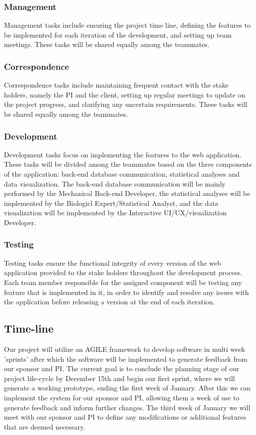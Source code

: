 \documentclass[10pt,twocolumn,letterpaper]{article}
\begin{document}
                \subsubsection{Management}
                Management tasks include ensuring the project time line, defining the features to be implemented for each iteration of the development, and setting up team meetings. 
                These tasks will be shared equally among the teammates.
                \subsubsection{Correspondence}
                Correspondence tasks include maintaining frequent contact with the stake holders, namely the PI and the client, setting up regular meetings to update on the project progress, and clarifying any uncertain requirements. 
                These tasks will be shared equally among the teammates.
                \subsubsection{Development}
                Development tasks focus on implementing the features to the web application. These tasks will be divided among the teammates based on the three components of the application: back-end database communication, statistical analyses and data visualization. 
                The back-end database communication will be mainly performed by the Mechanical Back-end Developer, the statistical analyses will be implemented by the Biologicl Expert/Statistical Analyst, and the data visualization will be implemented by the Interactive UI/UX/visualization Developer.
                \subsubsection{Testing}
                Testing tasks ensure the functional integrity of every version of the web application provided to the stake holders throughout the development process. Each team member responsible for the assigned component will be testing any feature that is implemented in it, in order to identify and resolve any issues with the application before releasing a version at the end of each iteration.
            \subsection{Time-line}

            Our project will utilize an AGILE framework to develop software in multi week 'sprints' after which the software will be implemented to generate feedback from our sponsor and PI. The current goal is to conclude the planning stage of our project life-cycle by December 15th and begin our first sprint, where we will generate a working prototype, ending the first week of January. After this we can implement the system for our sponsor and PI, allowing them a week of use to generate feedback and inform further changes. The third week of January we will meet with our sponsor and PI to define any modifications or additional features that are deemed necessary.
\end{document}
